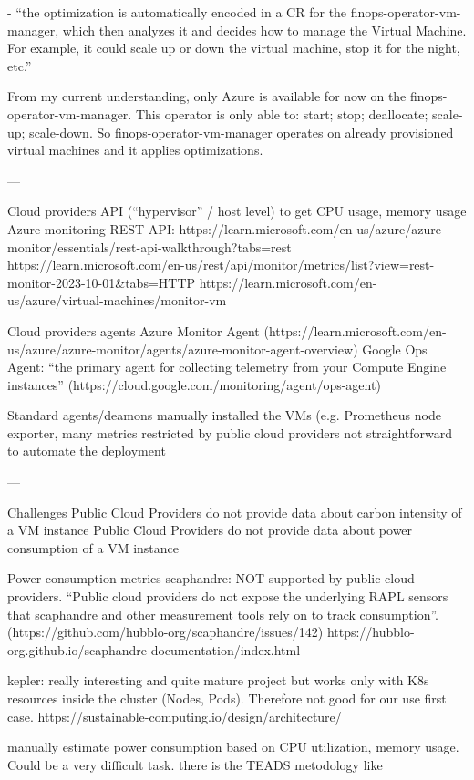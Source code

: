 - “the optimization is automatically encoded in a CR for the finops-operator-vm-manager, which then analyzes it and decides how to manage the Virtual Machine. For example, it could scale up or down the virtual machine, stop it for the night, etc.”

From my current understanding, only Azure is available for now on the finops-operator-vm-manager. 
This operator is only able to: start; stop; deallocate; scale-up; scale-down.
So finops-operator-vm-manager operates on already provisioned virtual machines and it applies optimizations.

---



Cloud providers API (“hypervisor” / host level) to get CPU usage, memory usage
Azure monitoring REST API: https://learn.microsoft.com/en-us/azure/azure-monitor/essentials/rest-api-walkthrough?tabs=rest%
https://learn.microsoft.com/en-us/rest/api/monitor/metrics/list?view=rest-monitor-2023-10-01&tabs=HTTP
https://learn.microsoft.com/en-us/azure/virtual-machines/monitor-vm 


Cloud providers agents
Azure Monitor Agent (https://learn.microsoft.com/en-us/azure/azure-monitor/agents/azure-monitor-agent-overview)
Google Ops Agent: “the primary agent for collecting telemetry from your Compute Engine instances” (https://cloud.google.com/monitoring/agent/ops-agent)


Standard agents/deamons manually installed the VMs (e.g. Prometheus node exporter, 
many metrics restricted by public cloud providers
not straightforward to automate the deployment


---

Challenges
Public Cloud Providers do not provide data about carbon intensity of a VM instance
Public Cloud Providers do not provide data about power consumption of a VM instance

Power consumption metrics
scaphandre: NOT supported by public cloud providers. “Public cloud providers do not expose the underlying RAPL sensors that scaphandre and other measurement tools rely on to track consumption”. (https://github.com/hubblo-org/scaphandre/issues/142)
https://hubblo-org.github.io/scaphandre-documentation/index.html

kepler: really interesting and quite mature project but works only with K8s resources inside the cluster (Nodes, Pods). Therefore not good for our use first case.
https://sustainable-computing.io/design/architecture/


manually estimate power consumption based on CPU utilization, memory usage. Could be a very difficult task. 
there is the TEADS metodology like 



